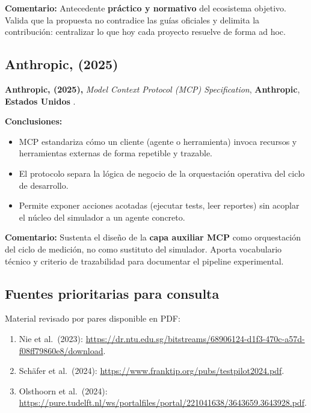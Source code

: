 \textbf{Comentario:} Antecedente \textbf{práctico y normativo} del ecosistema objetivo. Valida que la propuesta no contradice las guías oficiales y delimita la contribución: centralizar lo que hoy cada proyecto resuelve de forma ad hoc.

\subsection{Anthropic, (2025)}
\label{sec:antecedente_mcp}

\textbf{Anthropic, (2025),} \textit{Model Context Protocol (MCP) Specification}, \textbf{Anthropic}, \textbf{Estados Unidos} \cite{mcp-spec2025}.

\textbf{Conclusiones:}
\begin{itemize}
    \item MCP estandariza cómo un cliente (agente o herramienta) invoca recursos y herramientas externas de forma repetible y trazable.
    \item El protocolo separa la lógica de negocio de la orquestación operativa del ciclo de desarrollo.
    \item Permite exponer acciones acotadas (ejecutar tests, leer reportes) sin acoplar el núcleo del simulador a un agente concreto.
\end{itemize}

\textbf{Comentario:} Sustenta el diseño de la \textbf{capa auxiliar MCP} como orquestación del ciclo de medición, no como sustituto del simulador. Aporta vocabulario técnico y criterio de trazabilidad para documentar el pipeline experimental.

\subsection{Fuentes prioritarias para consulta}
\label{sec:fuentes_prioritarias_descarga}
Material revisado por pares disponible en PDF:

\begin{enumerate}
    \item Nie et al.\ (2023): \url{https://dr.ntu.edu.sg/bitstreams/68906124-d1f3-470c-a57d-f08ff79860e8/download}.
    \item Schäfer et al.\ (2024): \url{https://www.franktip.org/pubs/testpilot2024.pdf}.
    \item Olsthoorn et al.\ (2024): \url{https://pure.tudelft.nl/ws/portalfiles/portal/221041638/3643659.3643928.pdf}.
\end{enumerate}
